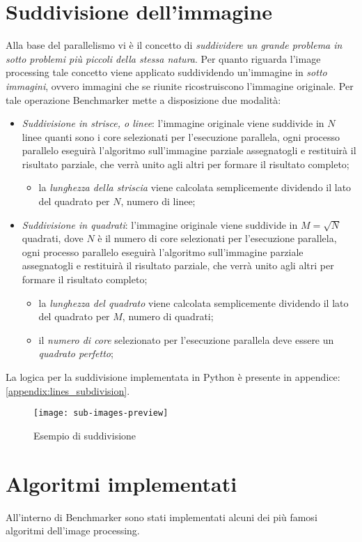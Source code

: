 \section{Suddivisione dell'immagine}
Alla base del parallelismo vi è il concetto di \textit{suddividere un grande problema in sotto problemi più piccoli della stessa natura}.
Per quanto riguarda l'image processing tale concetto viene applicato suddividendo un'immagine in \textit{sotto immagini}, ovvero immagini che se riunite ricostruiscono l'immagine originale.
Per tale operazione Benchmarker mette a disposizione due modalità:
\begin{itemize}
	\item \textit{Suddivisione in strisce, o linee}: l'immagine originale viene suddivide in $N$ linee quanti sono i core selezionati per l'esecuzione parallela, ogni processo parallelo eseguirà l'algoritmo sull'immagine parziale assegnatogli e restituirà il risultato parziale, che verrà unito agli altri per formare il risultato completo;
	\begin{itemize}
		\item la \textit{lunghezza della striscia} viene calcolata semplicemente dividendo il lato del quadrato per $N$, numero di linee;
	\end{itemize}
	\item \textit{Suddivisione in quadrati}: l'immagine originale viene suddivide in $M = \sqrt{N}$ quadrati, dove $N$ è il numero di core selezionati per l'esecuzione parallela, ogni processo parallelo eseguirà l'algoritmo sull'immagine parziale assegnatogli e restituirà il risultato parziale, che verrà unito agli altri per formare il risultato completo;
	\begin{itemize}
		\item la \textit{lunghezza del quadrato} viene calcolata semplicemente dividendo il lato del quadrato per $M$, numero di quadrati;
		\item il \textit{numero di core} selezionato per l'esecuzione parallela deve essere un \textit{quadrato perfetto};
	\end{itemize}
\end{itemize}
\noindent La logica per la suddivisione implementata in Python è presente in appendice: \ref{appendix:lines_subdivision}.
 \begin{figure}[H]
	\centering
	\texttt{[image: sub-images-preview]}
	\caption{Esempio di suddivisione}
\end{figure}

\section{Algoritmi implementati}
All'interno di Benchmarker sono stati implementati alcuni dei più famosi algoritmi dell'image processing.

